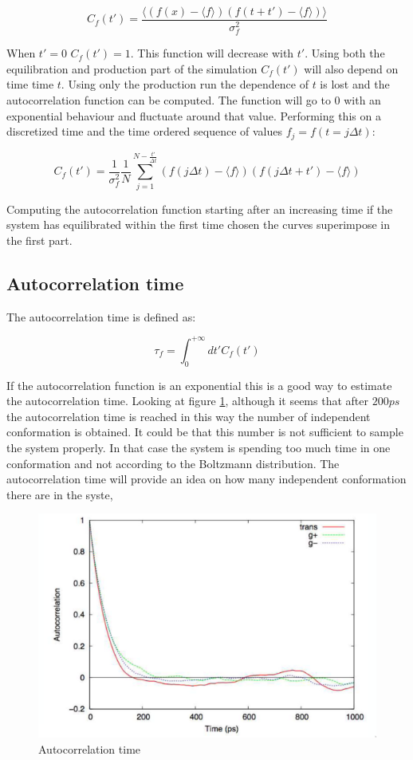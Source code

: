 	$$C_f(t') = \frac{\bigl\langle(f(x)-\langle f\rangle)(f(t+t') - \langle f\rangle)\bigr\rangle}{\sigma^2_f}$$

	When $t'=0$ $C_f(t') = 1$.
	This function will decrease with $t'$.
	Using both the equilibration and production part of the simulation $C_f(t')$ will also depend on time time $t$.
	Using only the production run the dependence of $t$ is lost and the autocorrelation function can be computed.
	The function will go to $0$ with an exponential behaviour and fluctuate around that value.
	Performing this on a discretized time and the time ordered sequence of values $f_j = f(t=j\Delta t)$:

	$$C_f(t') = \frac{1}{\sigma^2_f}\frac{1}{N}\sum\limits_{j=1}^{N-\frac{t'}{\Delta t}}(f(j\Delta t)-\langle f\rangle)(f(j\Delta t + t')-\langle f\rangle)$$

	Computing the autocorrelation function starting after an increasing time if the system has equilibrated within the first time chosen the curves superimpose in the first part.

	\subsection{Autocorrelation time}
	The autocorrelation time is defined as:

	$$\tau_f = \int_0^{+\infty} dt' C_f(t')$$

	If the autocorrelation function is an exponential this is a good way to estimate the autocorrelation time.
	Looking at figure \ref{fig:autocorrelation-time}, although it seems that after $200ps$ the autocorrelation time is reached in this way the number of independent conformation is obtained.
	It could be that this number is not sufficient to sample the system properly.
	In that case the system is spending too much time in one conformation and not according to the Boltzmann distribution.
	The autocorrelation time will provide an idea on how many independent conformation there are in the syste,

	\begin{figure}[H]
		\centering
		\includegraphics[scale = 0.6]{autocorrelation-time}
		\caption{Autocorrelation time}
		\label{fig:autocorrelation-time}
	\end{figure}


